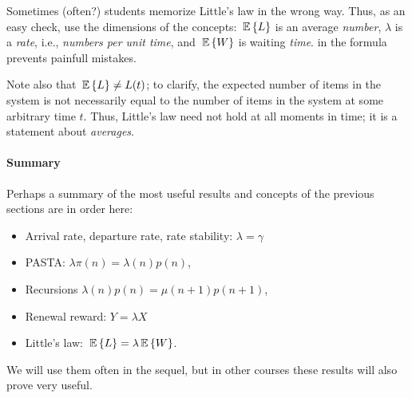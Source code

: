 \begin{remark}
  Sometimes (often?) students memorize Little's law in the wrong
  way. Thus, as an easy check, use the dimensions of the concepts:
  $\,\mathbb{E}\left\{L\right\}$ is an average \emph{number}, $\lambda$ is a \emph{rate},
  i.e., \emph{numbers per unit time}, and $\,\mathbb{E}\left\{W\right\}$ is waiting
  \emph{time}.  in the formula
  prevents painfull mistakes.

  Note also that $\,\mathbb{E}\left\{L\right\}\neq L(t)$; to clarify, the expected number of
  items in the system is not necessarily equal to the number of items
  in the system at some arbitrary time $t$. Thus, Little's law need
  not hold at all moments in time; it is a statement about
  \emph{averages}.
\end{remark}

\paragraph{Summary}

Perhaps a summary of the most useful results and concepts of the previous sections
are in order here:
\begin{itemize}
\item Arrival rate,  departure  rate, rate stability:  $\lambda = \gamma$
\item PASTA: $\lambda \pi(n) = \lambda(n) p(n)$,
\item Recursions $\lambda(n)p(n) = \mu(n+1) p(n+1)$,
\item Renewal reward: $Y=\lambda X$
\item Little's law: $\,\mathbb{E}\left\{L\right\} =\lambda \,\mathbb{E}\left\{W\right\}$.
\end{itemize}
 We will use them often in the sequel,
but in other courses these results will also prove very useful.


